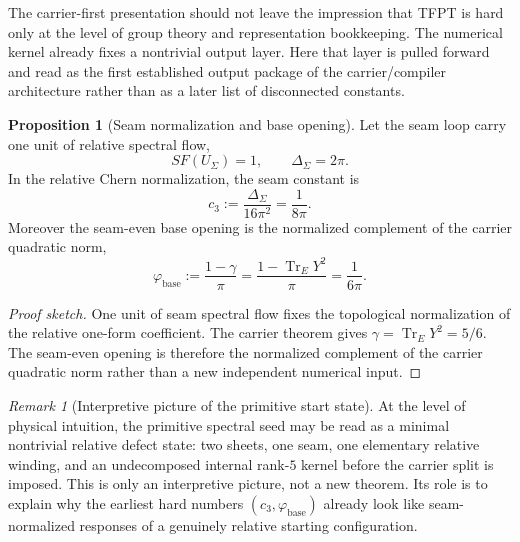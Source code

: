 \documentclass[11pt,a4paper]{article}
\theoremstyle{definition}
\newtheorem{proposition}[theorem]{Proposition}
\theoremstyle{remark}
\newtheorem*{remark}{Remark}
\DeclareMathOperator{\tr}{Tr}
\newcommand{\Seam}{\Sigma}
\newcommand{\cthree}{c_3}
\newcommand{\phibase}{\varphi_{\mathrm{base}}}
\begin{document}
The carrier-first presentation should not leave the impression that TFPT is hard only at the level of group theory and representation bookkeeping. The numerical kernel already fixes a nontrivial output layer. Here that layer is pulled forward and read as the first established output package of the carrier/compiler architecture rather than as a later list of disconnected constants.

\begin{proposition}[Seam normalization and base opening]
Let the seam loop carry one unit of relative spectral flow,
\[
SF(U_\Seam)=1,
\qquad
\Delta_\Seam=2\pi.
\]
In the relative Chern normalization, the seam constant is
\[
\cthree:=\frac{\Delta_\Seam}{16\pi^2}=\frac{1}{8\pi}.
\]
Moreover the seam-even base opening is the normalized complement of the carrier quadratic norm,
\[
\phibase
:=
\frac{1-\gamma}{\pi}
=
\frac{1-\tr_EY^2}{\pi}
=
\frac{1}{6\pi}.
\]
\end{proposition}

\begin{proof}[Proof sketch]
One unit of seam spectral flow fixes the topological normalization of the relative one-form coefficient. The carrier theorem gives $\gamma=\tr_EY^2=5/6$. The seam-even opening is therefore the normalized complement of the carrier quadratic norm rather than a new independent numerical input.
\end{proof}

\begin{remark}[Interpretive picture of the primitive start state]
At the level of physical intuition, the primitive spectral seed may be read as a minimal nontrivial relative defect state: two sheets, one seam, one elementary relative winding, and an undecomposed internal rank-$5$ kernel before the carrier split is imposed. This is only an interpretive picture, not a new theorem. Its role is to explain why the earliest hard numbers $(\cthree,\phibase)$ already look like seam-normalized responses of a genuinely relative starting configuration.
\end{remark}
\end{document}
